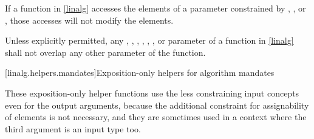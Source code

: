 \pnum
If a function in \ref{linalg} accesses the elements
of a parameter constrained by
,
, or
,
those accesses will not modify the elements.

\pnum
Unless explicitly permitted, any
,
,
,
,
,
, or
parameter of a function in \ref{linalg}
shall not overlap any other  parameter of the function.

[linalg.helpers.mandates]{Exposition-only helpers for algorithm mandates}

\pnum
\begin{note}
These exposition-only helper functions use
the less constraining input concepts even for the output arguments,
because the additional constraint for assignability of elements
is not necessary, and
they are sometimes used in a context
where the third argument is an input type too.
\end{note}

